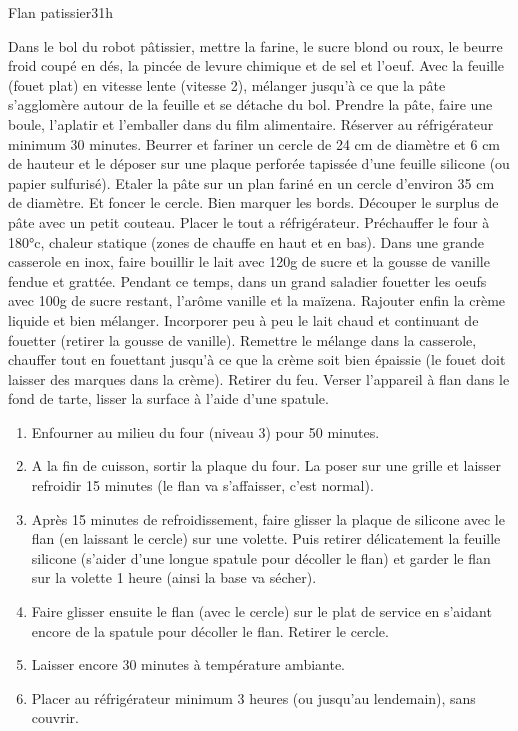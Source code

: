 {\begin{recette}{Flan patissier}{3}{}{1h}
\begin{preparation}
\etape Dans le bol du robot pâtissier, mettre la farine, le sucre blond ou roux, le beurre froid coupé en dés, la pincée de levure chimique et de sel et l'oeuf. Avec la feuille (fouet plat) en vitesse lente (vitesse 2), mélanger jusqu'à ce que la pâte s'agglomère autour de la feuille et se détache du bol.
\etape Prendre la pâte, faire une boule, l'aplatir et l'emballer dans du film alimentaire. Réserver au réfrigérateur minimum 30 minutes.
\etape Beurrer et fariner un cercle de 24 cm de diamètre et 6 cm de hauteur et le déposer sur une plaque perforée tapissée d'une feuille silicone (ou papier sulfurisé).
\etape Etaler la pâte sur un plan fariné en un cercle d'environ 35 cm de diamètre.
\etape Et foncer le cercle. Bien marquer les bords. Découper le surplus de pâte avec un petit couteau. Placer le tout a réfrigérateur.
\etape Préchauffer le four à 180°c, chaleur statique (zones de chauffe en haut et en bas).
\etape Dans une grande casserole en inox, faire bouillir le lait avec 120g de sucre et la gousse de vanille fendue et grattée.
\etape Pendant ce temps, dans un grand saladier fouetter les oeufs avec 100g de sucre restant, l'arôme vanille et la maïzena. Rajouter enfin la crème liquide et bien mélanger.
\etape Incorporer peu à peu le lait chaud et continuant de fouetter (retirer la gousse de vanille).
\etape Remettre le mélange dans la casserole, chauffer tout en fouettant jusqu'à ce que la crème soit bien épaissie (le fouet doit laisser des marques dans la crème). Retirer du feu.
\etape Verser l'appareil à flan dans le fond de tarte, lisser la surface à l'aide d'une spatule.
\end{preparation}

\begin{cuisson}
\begin{enumerate}
\item Enfourner au milieu du four (niveau 3) pour 50 minutes.
\item A la fin de cuisson, sortir la plaque du four. La poser sur une grille et laisser refroidir 15 minutes (le flan va s'affaisser, c'est normal).
\item Après 15 minutes de refroidissement, faire glisser la plaque de silicone avec le flan (en laissant le cercle) sur une volette. Puis retirer délicatement la feuille silicone (s'aider d'une longue spatule pour décoller le flan) et garder le flan sur la volette 1 heure (ainsi la base va sécher).
\item Faire glisser ensuite le flan (avec le cercle) sur le plat de service en s'aidant encore de la spatule pour décoller le flan. Retirer le cercle.
\item Laisser encore 30 minutes à température ambiante.
\item Placer au réfrigérateur minimum 3 heures (ou jusqu'au lendemain), sans couvrir.
\end{enumerate}


\end{cuisson}
\end{recette}}
